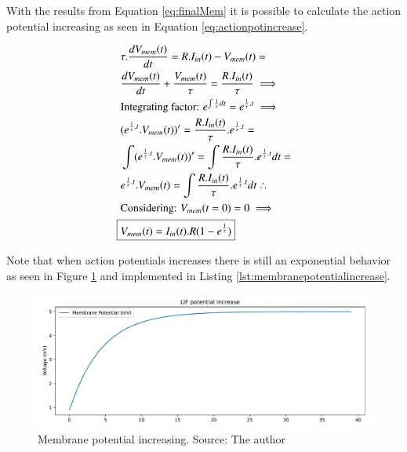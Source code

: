  			\par With the results from Equation \ref{eq:finalMem} it is possible to calculate the action potential increasing as seen in Equation \ref{eq:actionpotincrease}.
 			
 			\begin{equation}
 				\label{eq:actionpotincrease}
 				\begin{aligned}
 					&\tau.\dfrac{dV_{mem}(t)}{dt} = R.I_{in}(t) - V_{mem}(t) = \\
 					&\dfrac{dV_{mem}(t)}{dt} + \frac{V_{mem}(t)}{\tau} = \frac{R.I_{in}(t)}{\tau} \implies \\
 					&\text{Integrating factor: } e^{\int \frac{1}{\tau} dt} = e^{\frac{1}{\tau}.t} \implies \\
					&(e^{\frac{1}{\tau}.t}.V_{mem}(t))' = \frac{R.I_{in}(t)}{\tau}.e^{\frac{1}{\tau}.t} = \\
					&\int (e^{\frac{1}{\tau}.t}.V_{mem}(t))' = \int \frac{R.I_{in}(t)}{\tau}.e^{\frac{1}{\tau}.t} dt = \\
					&e^{\frac{1}{\tau}.t}.V_{mem}(t) = \int \frac{R.I_{in}(t)}{\tau}.e^{\frac{1}{\tau}.t} dt \therefore \\
					& \text{Considering: } V_{mem}(t=0) = 0 \implies \\
					\Aboxed{&V_{mem}(t) = I_{in}(t).R(1-e^{\frac{1}{\tau}})}
 				\end{aligned}
 			\end{equation}
 		
 			\par Note that when action potentials increases there is still an exponential behavior as seen in Figure \ref{fig:membranepotentialincrease} and implemented in Listing \ref{lst:membranepotentialincrease}.
 			
 				

	 			\begin{figure}[H]
	 				\centering
	 				\includegraphics[width=\linewidth]{images/membranePotentialIncrease}
	 				\caption{Membrane potential increasing. Source: The author}
	 				\label{fig:membranepotentialincrease}
	 			\end{figure}
 		
